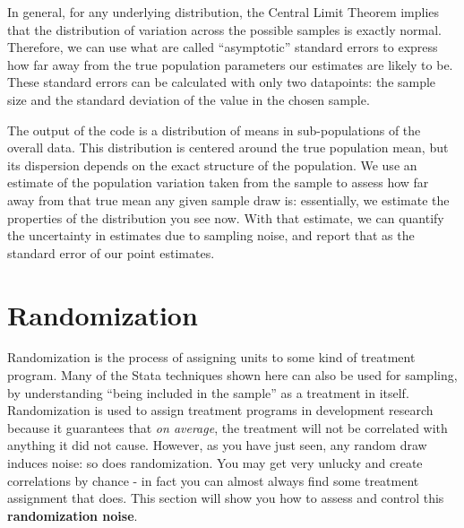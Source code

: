 In general, for any underlying distribution, the Central Limit Theorem implies that
the distribution of variation across the possible samples is exactly normal.
Therefore, we can use what are called ``asymptotic'' standard errors
to express how far away from the true population parameters our estimates are likely to be.
These standard errors can be calculated with only two datapoints:
the sample size and the standard deviation of the value in the chosen sample.


{
}

The output of the code is a distribution of means in sub-populations of the overall data.
This distribution is centered around the true population mean,
but its dispersion depends on the exact structure of the population.
We use an estimate of the population variation taken from the sample
to assess how far away from that true mean any given sample draw is:
essentially, we estimate the properties of the distribution you see now.
With that estimate, we can quantify the uncertainty in estimates due to sampling noise,
and report that as the standard error of our point estimates.

\section{Randomization}

Randomization is the process of assigning units to some kind of treatment program.
Many of the Stata techniques shown here can also be used for sampling,
by understanding ``being included in the sample'' as a treatment in itself.
Randomization is used to assign treatment programs in development research
because it guarantees that \textit{on average},
the treatment will not be correlated with anything it did not cause.
However, as you have just seen, any random draw induces noise: so does randomization.
You may get very unlucky and create correlations by chance -
in fact you can almost always find some treatment assignment that does.
This section will show you how to assess and control this \textbf{randomization noise}.

